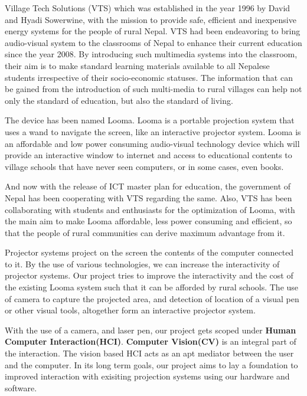 \documentclass[12pt, a4paper]{article}
\begin{document}
\indent
Village Tech Solutions (VTS) which was established in the year 1996 by David and Hyadi Sowerwine, with the mission to provide safe, efficient and inexpensive energy systems for the people of rural Nepal. VTS had been endeavoring to bring audio-visual system to the classrooms of Nepal to enhance their current education since the year 2008. By introducing such multimedia systems into the classroom, their aim is to make standard learning materials available to all Nepalese students irrespective of their socio-economic statuses. The information that can be gained from the introduction of such multi-media to rural villages can help not only the
standard of education, but also the standard of living. 

The device has been named Looma. Looma is a portable projection system that uses a wand to navigate the screen, like an interactive projector system. Looma is an affordable and low power consuming audio-visual technology device which will provide an interactive window to internet and access to educational contents to village schools that have never seen computers, or in some cases, even books.

And now with the release of ICT master plan for education, the government
of Nepal has been cooperating with VTS regarding the same. Also, VTS
has been collaborating with students and enthusiasts for the optimization of
Looma, with the main aim to make Looma affordable, less power consuming
and efficient, so that the people of rural communities can derive maximum
advantage from it.

Projector systems project on the screen the contents of the computer connected to it. By the use of various technologies, we can increase the interactivity of projector systems. Our project tries to improve the interactivity and the cost of the existing Looma system such that it can be afforded by rural schools. The use of camera to capture the projected area, and detection of location of a visual pen or other visual tools, altogether form an interactive projector system. 

With the use of a camera, and laser pen, our project gets scoped under \textbf{Human Computer Interaction(HCI)}. \textbf{Computer Vision(CV)} is an integral part of the interaction. The vision based HCI acts as an apt mediator between the user and the computer. In its long term goals, our project aims to lay a foundation to improved interaction with exisiting projection systems using our hardware and software. 
\end{document}
